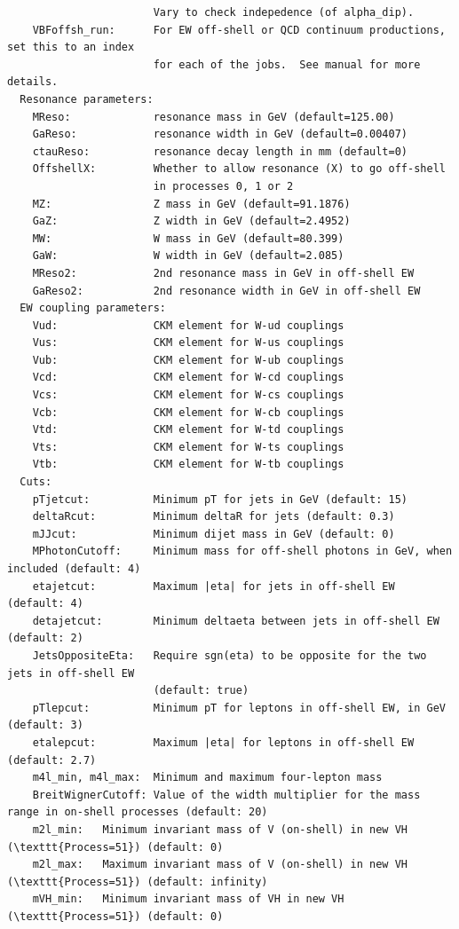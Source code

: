 \documentclass[aps,superscriptaddress,nofootinbib]{revtex4}
\begin{document}
\begin{verbatim}
                       Vary to check indepedence (of alpha_dip).
    VBFoffsh_run:      For EW off-shell or QCD continuum productions, set this to an index
                       for each of the jobs.  See manual for more details.
  Resonance parameters:
    MReso:             resonance mass in GeV (default=125.00)
    GaReso:            resonance width in GeV (default=0.00407)
    ctauReso:          resonance decay length in mm (default=0)
    OffshellX:         Whether to allow resonance (X) to go off-shell
                       in processes 0, 1 or 2
    MZ:                Z mass in GeV (default=91.1876)
    GaZ:               Z width in GeV (default=2.4952)
    MW:                W mass in GeV (default=80.399)
    GaW:               W width in GeV (default=2.085)
    MReso2:            2nd resonance mass in GeV in off-shell EW
    GaReso2:           2nd resonance width in GeV in off-shell EW
  EW coupling parameters:
    Vud:               CKM element for W-ud couplings
    Vus:               CKM element for W-us couplings
    Vub:               CKM element for W-ub couplings
    Vcd:               CKM element for W-cd couplings
    Vcs:               CKM element for W-cs couplings
    Vcb:               CKM element for W-cb couplings
    Vtd:               CKM element for W-td couplings
    Vts:               CKM element for W-ts couplings
    Vtb:               CKM element for W-tb couplings
  Cuts:
    pTjetcut:          Minimum pT for jets in GeV (default: 15)
    deltaRcut:         Minimum deltaR for jets (default: 0.3)
    mJJcut:            Minimum dijet mass in GeV (default: 0)
    MPhotonCutoff:     Minimum mass for off-shell photons in GeV, when included (default: 4)
    etajetcut:         Maximum |eta| for jets in off-shell EW (default: 4)
    detajetcut:        Minimum deltaeta between jets in off-shell EW (default: 2)
    JetsOppositeEta:   Require sgn(eta) to be opposite for the two jets in off-shell EW
                       (default: true)
    pTlepcut:          Minimum pT for leptons in off-shell EW, in GeV (default: 3)
    etalepcut:         Maximum |eta| for leptons in off-shell EW (default: 2.7)
    m4l_min, m4l_max:  Minimum and maximum four-lepton mass 
    BreitWignerCutoff: Value of the width multiplier for the mass range in on-shell processes (default: 20) 
    m2l_min:   Minimum invariant mass of V (on-shell) in new VH (\texttt{Process=51}) (default: 0)
    m2l_max:   Maximum invariant mass of V (on-shell) in new VH (\texttt{Process=51}) (default: infinity)
    mVH_min:   Minimum invariant mass of VH in new VH (\texttt{Process=51}) (default: 0)

\end{verbatim}
\end{document}
